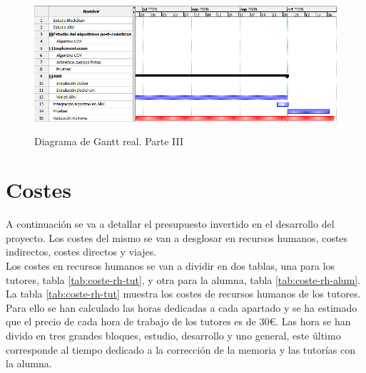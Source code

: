 \begin{figure}[H]
	\centering
	\includegraphics[width=13cm,height=5cm]{figuras/Gantt_3.png}
	\caption{Diagrama de Gantt real. Parte III}
	\label{fig:gantt-real-3}
\end{figure}


\section{Costes}

A continuación se va a detallar el presupuesto invertido en el desarrollo del proyecto. Los costes del mismo se van a desglosar en recursos humanos, costes indirectos, costes directos y viajes.\\



Los costes en recursos humanos se van a dividir en dos tablas, una para los tutores, tabla \ref{tab:coste-rh-tut}, y otra para la alumna, tabla \ref{tab:coste-rh-alum}.\\

La tabla \ref{tab:coste-rh-tut} muestra los costes de recursos humanos de los tutores. Para ello se han calculado las horas dedicadas a cada apartado y se ha estimado que el precio de cada hora de trabajo de los tutores es de $30$\euro. Las hora se han divido en tres grandes bloques, estudio, desarrollo y uno general, este último corresponde al tiempo dedicado a la corrección de la memoria y las tutorías con la alumna.\\



